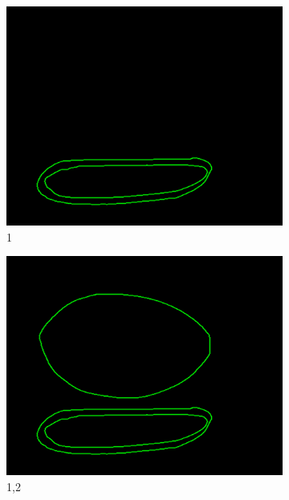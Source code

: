 \documentclass[11pt]{article}
\begin{document}
\begin{figure}
	\centering
	\begin{subfigure}[t]{0.32\textwidth}
	\centering
		\includegraphics[scale=0.28]{pics/elimination/joinedAfterRemoval1.png}
		\caption{1}
		\label{construction1}
	\end{subfigure}
	\begin{subfigure}[t]{0.32\textwidth}
	\centering
		\includegraphics[scale=0.28]{pics/elimination/joinedAfterRemoval2.png}
		\caption{1,2}
		\label{construction2}
	\end{subfigure}
	\begin{subfigure}[t]{0.32\textwidth}
	\centering

\end{subfigure}
\end{figure}
\end{document}
